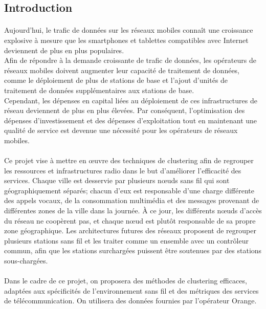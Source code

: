 \documentclass{article}
\begin{document}
  \begin{center}
\section*{\LARGE{Introduction}}
  \end{center}
\Large{\paragraph{}
        Aujourd'hui, le trafic de données sur les réseaux mobiles connaît une croissance explosive à mesure que les smartphones et tablettes compatibles avec Internet deviennent de plus en plus populaires.\\
Afin de répondre à la demande croissante de trafic de données, les opérateurs de réseaux mobiles doivent augmenter leur capacité de traitement de données, comme le déploiement de plus de stations de base et l'ajout d'unités de traitement de données supplémentaires aux stations de base. \\
Cependant, les dépenses en capital liées au déploiement de ces infrastructures de réseau deviennent de plus en plus élevées. Par conséquent, l'optimisation des dépenses d'investissement et des dépenses d'exploitation tout en maintenant une qualité de service est devenue une nécessité pour les opérateurs de réseaux mobiles.
\paragraph{}
Ce projet vise à mettre en œuvre des techniques de clustering afin de regrouper les ressources et infrastructures radio dans le but d'améliorer l'efficacité des services. 
Chaque ville est desservie par plusieurs nœuds sans fil qui sont géographiquement séparés; chacun d'eux est responsable d'une charge différente des appels vocaux, de la consommation multimédia et des messages provenant de différentes zones de la ville dans la journée. 
À ce jour, les différents nœuds d'accès  du réseau ne coopèrent pas, et chaque nœud est plutôt responsable de sa propre zone géographique. Les architectures futures des réseaux proposent de regrouper plusieurs stations sans fil et les traiter comme un ensemble avec un contrôleur commun, afin que les stations surchargées puissent être soutenues par des stations sous-chargées. 
\paragraph{}
Dans le cadre de ce projet, on proposera des méthodes de clustering efficaces, adaptées aux spécificités de l'environnement sans fil et des métriques des services de télécommunication. On utilisera des données fournies par l'opérateur Orange.
}
\newpage
\end{document}
